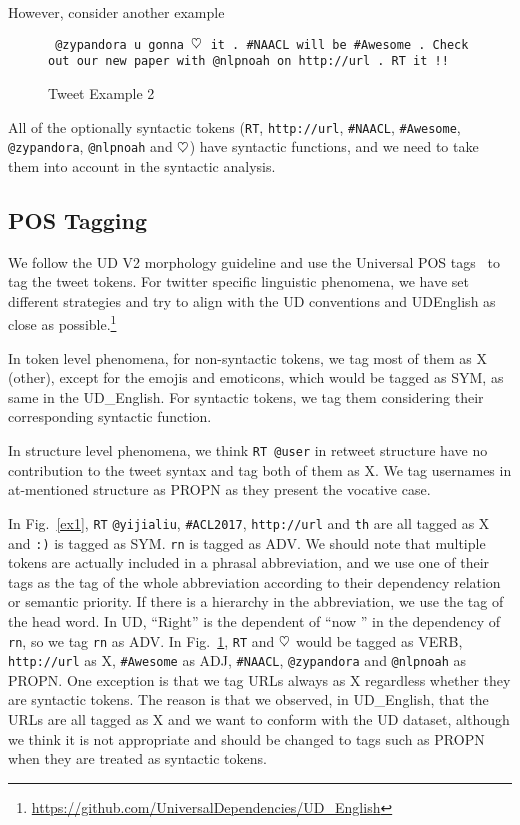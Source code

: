 \documentclass[11pt,letterpaper]{article}
\newcommand{\heart}{\ensuremath\heartsuit}
\begin{document}
However, consider another example
\begin{figure}[h]
\small
{\tt
@zypandora u gonna $\heart$ it . \#NAACL will be \#Awesome . Check out our new paper with @nlpnoah on http://url . RT it !!
}
\caption{Tweet Example 2}
\label{ex2}
\end{figure}

All of the optionally syntactic tokens ({\tt RT}, {\tt http://url}, {\tt \#NAACL}, {\tt \#Awesome}, {\tt @zypandora}, {\tt @nlpnoah} and {\tt $\heart$}) have syntactic functions, and we need to take them into account in the syntactic analysis.



\subsection{POS Tagging}
We follow the UD V2 morphology guideline and use the Universal POS tags~\cite{PETROV12.274} to tag the tweet tokens. For twitter specific linguistic phenomena, we have set different strategies and try to align with the UD conventions and UD\textunderscore English as close as possible.\footnote{\url{https://github.com/UniversalDependencies/UD\_English}}

In token level phenomena, for non-syntactic tokens, we tag most of them as X (other), except for the emojis and emoticons, which would be tagged as SYM, as same in the UD\_English. 
For syntactic tokens, we tag them considering their corresponding syntactic function.

In structure level phenomena, we think {\tt RT @user} in retweet structure have no contribution to the tweet syntax and tag both of them as X.
We tag usernames in at-mentioned structure as PROPN as they present the vocative case.

In Fig.~\ref{ex1}, {\tt RT} {\tt @yijialiu}, {\tt \#ACL2017}, {\tt http://url} and {\tt th} are all tagged as X and {\tt :)} is tagged as SYM. 
{\tt rn} is tagged as ADV.
We should note that multiple tokens are actually included in a phrasal abbreviation, and we use one of their tags as the tag of the whole abbreviation according to their dependency relation or semantic priority.
If there is a hierarchy in the abbreviation, we use the tag of the head word. In UD, ``Right'' is the dependent of ``now '' in the dependency of {\tt rn}, so we tag {\tt rn} as ADV. 
In Fig.~\ref{ex2}, {\tt RT} and {\tt $\heart$} would be tagged as VERB, {\tt http://url} as X, {\tt \#Awesome} as ADJ, {\tt \#NAACL}, {\tt @zypandora} and {\tt @nlpnoah} as PROPN. One exception is that we tag URLs always as X regardless whether they are syntactic tokens. The reason is that we observed, in UD\_English, that the URLs are all tagged as X and we want to conform with the UD dataset, although we think it is not appropriate and should be changed to tags such as PROPN when they are treated as syntactic tokens.
\end{document}
